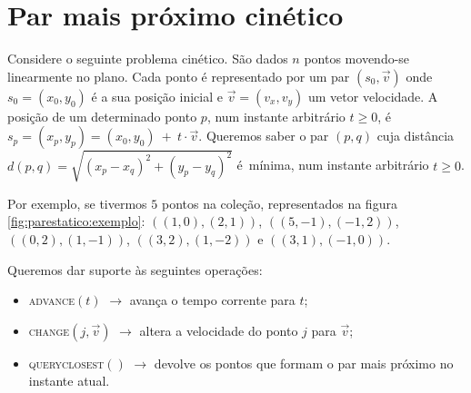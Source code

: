 

\chapter{Par mais próximo cinético}

Considere o seguinte problema cinético. São dados $n$ pontos
movendo-se linearmente no plano. Cada ponto é representado por um
par $(s_0, \vec{v})$ onde $s_0 = (x_0, y_0)$ é a sua posição inicial
e $\vec{v} = (v_x, v_y)$ um vetor velocidade. A posição de um
determinado ponto $p$, num instante arbitrário $t \geq 0$, é $s_p =
(x_p, y_p) = (x_0, y_0)~+~t\cdot \vec{v}$. Queremos saber o par $(p,
q)$ cuja distância $d(p, q) = \sqrt{(x_p - x_q)^2 + (y_p - y_q)^2}$
é~mínima, num instante arbitrário $t \geq 0$.

Por exemplo, se tivermos $5$ pontos na coleção, representados na
figura \ref{fig:parestatico:exemplo}: $((1, 0), (2, 1))$, $((5, -1),
(-1, 2))$, $((0, 2), (1, -1))$, $((3, 2), (1, -2))$ e $((3, 1), (-1,
0))$.



Queremos dar suporte às seguintes operações:
\begin{itemize}
    \item \textsc{advance}$(t)$ $\rightarrow$ avança o tempo corrente
    para $t$;
    \item \textsc{change}$(j, \vec{v})$ $\rightarrow$ altera a
    velocidade do ponto $j$ para $\vec{v}$;
    \item \textsc{query\textunderscore closest}$()$ $\rightarrow$
    devolve os pontos que formam o par mais próximo no instante
    atual.
\end{itemize}



